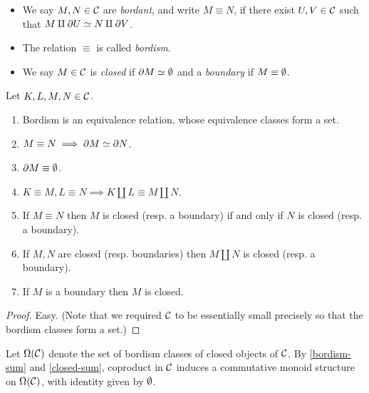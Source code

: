 \begin{definitions}
  \begin{itemize}[leftmargin=*]
  \item We say $M,N \in \mathcal{C}$ are \emph{bordant}, and write $M \equiv
    N$, if there exist $U,V \in \mathcal{C}$ such that $M \amalg \partial U \simeq N
    \amalg \partial V$.
  \item The relation $\equiv$ is called \emph{bordism}.
  \item We say $M \in \mathcal{C}$ is \emph{closed} if $\partial M \simeq \emptyset$ and a
    \emph{boundary} if $M \equiv \emptyset$.
  \end{itemize}
\end{definitions}

\begin{proposition}
  \label{bordism-props}
  Let $K,L,M,N \in \mathcal{C}$.
  \begin{enumerate}
  \item Bordism is an equivalence relation, whose equivalence classes
    form a set.
  \item $M \equiv N \implies \partial M \simeq \partial N$.
  \item $\partial M \equiv \emptyset$.
  \item \label{bordism-sum} $K \equiv M, L \equiv N \implies K \amalg
    L \equiv M \amalg N$.
  \item If $M \equiv N$ then $M$ is closed (resp. a boundary) if and
    only if $N$ is closed (resp. a boundary).
  \item \label{closed-sum} If $M,N$ are closed (resp. boundaries) then
    $M \amalg N$ is closed (resp. a boundary).
  \item If $M$ is a boundary then $M$ is closed.
  \end{enumerate}
\end{proposition}

\begin{proof}
  Easy. (Note that we required $\mathcal{C}$ to be essentially small precisely
  so that the bordism classes form a set.)
\end{proof}

\begin{definition}
  Let $\Omega(\mathcal{C})$ denote the set of bordism classes of closed objects
  of $\mathcal{C}$. By \eqref{bordism-sum} and \eqref{closed-sum}, coproduct in
  $\mathcal{C}$ induces a commutative monoid structure on $\Omega(\mathcal{C})$, with
  identity given by $\emptyset$.
\end{definition}


